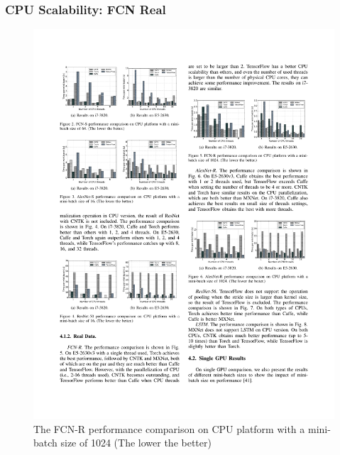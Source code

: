 \begin{frame}
	\MyLogo
	\frametitle{CPU Scalability: FCN Real}  
	\begin{figure}[htbp] 
		\includegraphics[width=\linewidth]{figures/FCN-R1.pdf} 
		\caption{The FCN-R performance comparison on CPU platform with a mini-batch size of 1024 (The lower the better)}
	\end{figure}
\end{frame}


